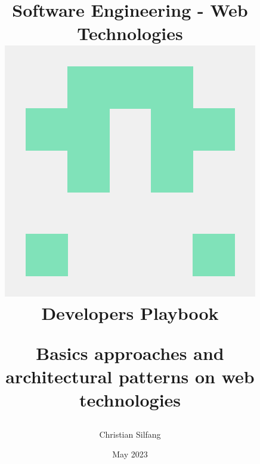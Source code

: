 \begin{titlepage}
    \title{
        \begin{center}
            \large{Software Engineering - Web Technologies}\\
            \Huge{\includegraphics[scale=0.15]{./comcy.png}}\\
            \vspace{1cm}
            \Huge{Developers Playbook}\\
        \end{center}
        \vspace{1cm}
        \begin{center}
            \Huge{Basics approaches and architectural patterns on web technologies}\\
            \vspace{3cm}
        \end{center}
    }
    \author{Christian Silfang}
    \vfill
    \date{\Huge{May 2023}}
    
    \end{titlepage} 
    